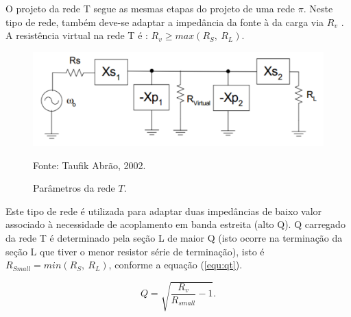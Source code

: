 O projeto da rede T segue as mesmas etapas do projeto de uma rede $\pi$. Neste tipo de rede,
também deve-se adaptar a impedância da fonte à da carga via $R_{v}$ . A resistência virtual
na rede T é \cite{abrao, taufik1}: $R_v \ge  max(R_S, \ R_L)$.

\begin{figure}[H]
    \centering
    \caption{Parâmetros da rede $T$.}
    \includegraphics[scale=0.3]{Imagens/fig4.png}
    \label{f_fig4}
    
    \small Fonte: Taufik Abrão, 2002.
\end{figure}


Este tipo de rede é utilizada para adaptar duas impedâncias de baixo valor associado à necessidade de acoplamento em banda estreita (alto Q).
Q carregado da rede T é determinado pela seção L de maior Q (isto ocorre na terminação da seção L que tiver o menor resistor série de terminação), isto é $R_{Small} = min(R_S, \ R_L)$, conforme a equação (\ref{equ:qt}).

\begin{equation}
Q = \sqrt{\frac{R_v}{R_{small}} -1 }.
\label{equ:qt}
\end{equation}